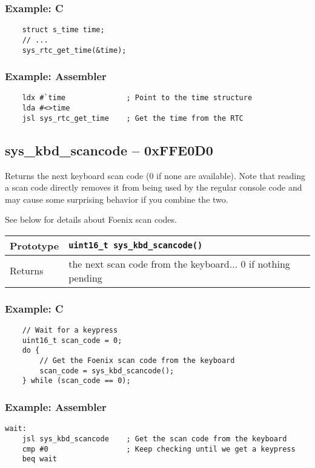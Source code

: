 \subsubsection*{Example: C}
\begin{lstlisting}
    struct s_time time;
    // ...
    sys_rtc_get_time(&time);
\end{lstlisting}

\subsubsection*{Example: Assembler}
\begin{verbatim}
    ldx #`time              ; Point to the time structure
    lda #<>time
    jsl sys_rtc_get_time    ; Get the time from the RTC
\end{verbatim}

\subsection*{sys\_kbd\_scancode -- 0xFFE0D0}
Returns the next keyboard scan code (0 if none are available).
Note that reading a scan code directly removes it from being used by the regular console code and may cause some surprising behavior if you combine the two.

See below for details about Foenix scan codes.

\bigskip

\begin{tabular}{|l||l|} \hline
Prototype & \lstinline!uint16_t sys_kbd_scancode()! \\ \hline
Returns & the next scan code from the keyboard... 0 if nothing pending \\ \hline
\end{tabular}

\subsubsection*{Example: C}
\begin{lstlisting}
    // Wait for a keypress
    uint16_t scan_code = 0;
    do {
        // Get the Foenix scan code from the keyboard
        scan_code = sys_kbd_scancode();
    } while (scan_code == 0);
\end{lstlisting}

\subsubsection*{Example: Assembler}
\begin{verbatim}
wait:
    jsl sys_kbd_scancode    ; Get the scan code from the keyboard
    cmp #0                  ; Keep checking until we get a keypress
    beq wait
\end{verbatim}


